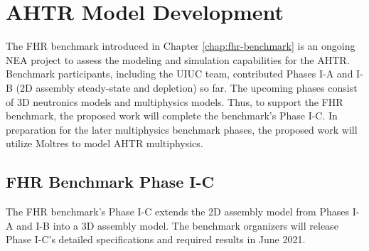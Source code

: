 \section{AHTR Model Development}
The \gls{FHR} benchmark introduced in Chapter \ref{chap:fhr-benchmark} is an 
ongoing \gls{NEA} project to assess the modeling and simulation capabilities 
for the \gls{AHTR}. 
Benchmark participants, including the \gls{UIUC} team, contributed Phases I-A 
and I-B (2D assembly steady-state and depletion) so far.  
The upcoming phases consist of 3D neutronics models and multiphysics models. 
Thus, to support the \gls{FHR} benchmark, the proposed work will complete the 
benchmark's Phase I-C.
In preparation for the later multiphysics benchmark phases, the proposed 
work will utilize Moltres to model \gls{AHTR} multiphysics.

\subsection{FHR Benchmark Phase I-C}
The \gls{FHR} benchmark's Phase I-C extends the 2D assembly model from Phases 
I-A and I-B into a 3D assembly model. 
The benchmark organizers will release Phase I-C's detailed specifications and 
required results in June 2021.

